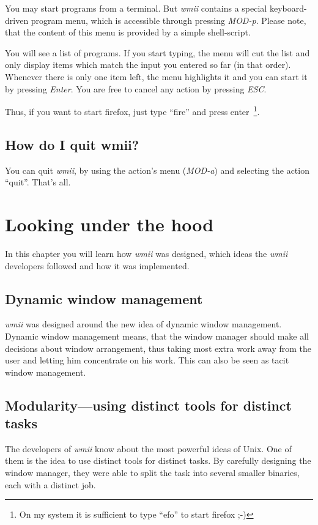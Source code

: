 \documentclass[12pt,a4paper]{article} %
\newcommand{\wmii}{\emph{wmii}}
\begin{document}
    You may start programs from a terminal. But \wmii{} contains a special
    keyboard-driven program menu, which is accessible through pressing
    \emph{MOD-p}. Please note, that the content of this menu is provided by a
    simple shell-script.

    You will see a list of programs. If you start typing, the
    menu will cut the list and only display items which match
    the input you entered so far (in that order). Whenever there is
    only one item left, the menu highlights it and you can start it
    by pressing \emph{Enter}. You are free to cancel any action by
    pressing \emph{ESC}.

    Thus, if you want to start firefox, just type ``fire'' and press
    enter~\footnote{On my system it is sufficient to type ``efo'' to
      start firefox ;-)}.

    \subsection{How do I quit wmii?}
    You can quit \wmii, by using the action's menu (\emph{MOD-a})
    and selecting the action ``quit''. That's all.
    
    \section{Looking under the hood}

    In this chapter you will learn how \wmii{} was designed, which ideas
    the \wmii{} developers followed and how it was implemented.

    \subsection{Dynamic window management}

    \wmii{} was designed around the new idea of dynamic window management.
    Dynamic window management means, that the window manager should make all
    decisions about window arrangement, thus taking most extra work away
    from the user and letting him concentrate on his work. This can also be
    seen as tacit window management.

    \subsection{Modularity---using distinct tools for distinct tasks}

    The developers of \wmii{} know about the most powerful ideas of
    Unix. One of them is the idea to use distinct tools for distinct
    tasks. By carefully designing the window manager, they were able to
    split the task into several smaller binaries, each with a distinct
    job.
    
\end{document}
